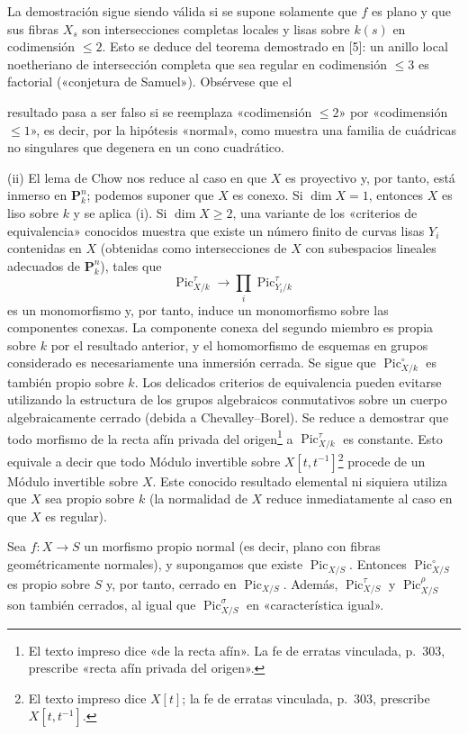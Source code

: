  La demostración sigue siendo válida si se supone
solamente que $f$ es plano y que sus fibras $X_s$ son intersecciones completas
locales y lisas sobre $k(s)$ en codimensión $\leq2$. Esto se deduce del teorema
demostrado en [5]: un anillo local noetheriano de intersección completa que sea
regular en codimensión $\leq3$ es factorial («conjetura de Samuel»). Obsérvese
que el

resultado pasa a ser falso si se reemplaza «codimensión $\leq2$» por
«codimensión $\leq1$», es decir, por la hipótesis «normal», como muestra una
familia de cuádricas no singulares que degenera en un cono cuadrático.

(ii) El lema de Chow nos reduce al caso en que $X$ es proyectivo y, por tanto,
está inmerso en $\mathbf P_k^n$; podemos suponer que $X$ es conexo. Si
$\dim X=1$, entonces $X$ es liso sobre $k$ y se aplica (i). Si $\dim X\geq2$,
una variante de los «criterios de equivalencia» conocidos muestra que existe
un número finito de curvas lisas $Y_i$ contenidas en $X$ (obtenidas como
intersecciones de $X$ con subespacios lineales adecuados de $\mathbf P_k^n$),
tales que
\[
\operatorname{Pic}_{X/k}^\tau\longrightarrow
\prod_i\operatorname{Pic}_{Y_i/k}^\tau
\]
es un monomorfismo y, por tanto, induce un monomorfismo sobre las componentes
conexas. La componente conexa del segundo miembro es propia sobre $k$ por el
resultado anterior, y el homomorfismo de esquemas en grupos considerado es
necesariamente una inmersión cerrada. Se sigue que
$\operatorname{Pic}_{X/k}^\circ$ es también propio sobre $k$. Los delicados
criterios de equivalencia pueden evitarse utilizando la estructura de los
grupos algebraicos conmutativos sobre un cuerpo algebraicamente cerrado
(debida a Chevalley--Borel). Se reduce a demostrar que todo morfismo de la
recta afín privada del origen\footnote{El texto impreso dice «de la recta
afín». La fe de erratas vinculada, p.~303, prescribe «recta afín privada del
origen».} a $\operatorname{Pic}_{X/k}^\tau$ es constante. Esto equivale a decir
que todo Módulo invertible sobre $X[t,t^{-1}]$\footnote{El texto impreso dice
$X[t]$; la fe de erratas vinculada, p.~303, prescribe $X[t,t^{-1}]$.} procede
de un Módulo invertible sobre $X$. Este conocido resultado elemental ni siquiera
utiliza que $X$ sea propio sobre $k$ (la normalidad de $X$ reduce
inmediatamente al caso en que $X$ es regular).

 Sea $f:X\longrightarrow S$ un morfismo propio normal
(es decir, plano con fibras geométricamente normales), y supongamos que existe
$\operatorname{Pic}_{X/S}$. Entonces $\operatorname{Pic}_{X/S}^\circ$ es propio
sobre $S$ y, por tanto, cerrado en $\operatorname{Pic}_{X/S}$. Además,
$\operatorname{Pic}_{X/S}^\tau$ y $\operatorname{Pic}_{X/S}^\rho$ son también
cerrados, al igual que $\operatorname{Pic}_{X/S}^\sigma$ en «característica
igual».


